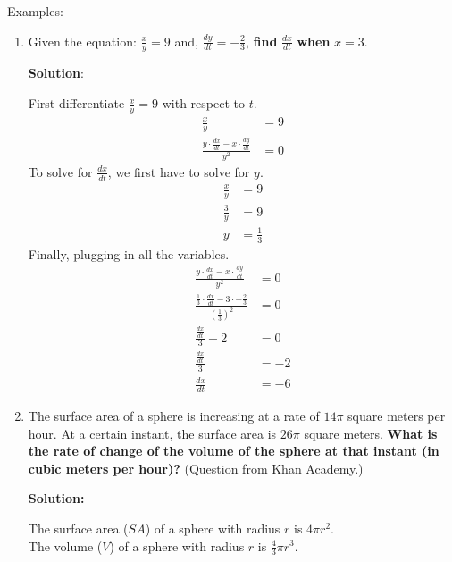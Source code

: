 \documentclass[12pt]{article}
\begin{document}
\noindent Examples:
\begin{enumerate}
	\item Given the equation: $\frac{x}{y} = 9$ and, $\frac{dy}{dt} = -\frac{2}{3}$, \textbf{find} $\frac{dx}{dt}$ \textbf{when} $x=3$.

	      \noindent \textbf{Solution}:

	      \noindent First differentiate $\frac{x}{y} = 9$ with respect to $t$.
	      \begin{align*}
		      \frac{x}{y}                                               & = 9 \\[6pt]
		      \frac{y \cdot \frac{dx}{dt} - x \cdot \frac{dy}{dt}}{y^2} & = 0
	      \end{align*}
	      To solve for $\frac{dx}{dt}$, we first have to solve for $y$.
	      \begin{align*}
		      \frac{x}{y} & = 9           \\[6pt]
		      \frac{3}{y} & = 9           \\[6pt]
		      y           & = \frac{1}{3}
	      \end{align*}
	      Finally, plugging in all the variables.
	      \begin{align*}
		      \frac{y \cdot \frac{dx}{dt} - x \cdot \frac{dy}{dt}}{y^2}                                   & = 0  \\[6pt]
		      \frac{\frac{1}{3} \cdot \frac{dx}{dt} - 3 \cdot -\frac{2}{3}}{\left( \frac{1}{3} \right)^2} & = 0  \\[6pt]
		      \frac{\frac{dx}{dt} }{3} + 2                                                                & = 0  \\[6pt]
		      \frac{\frac{dx}{dt}}{3}                                                                     & = -2 \\[6pt]
		      \frac{dx}{dt}                                                                               & = -6
	      \end{align*}
	      \smallskip

	\item The surface area of a sphere is increasing at a rate of $14 \pi$ square meters per hour. At a certain instant, the surface area is $26 \pi$ square meters. \textbf{What is the rate of change of the volume of the sphere at that instant (in cubic meters per hour)?} (Question from Khan Academy.)

	      \noindent \textbf{Solution:}

	      \noindent The surface area ($SA$) of a sphere with radius $r$ is $4 \pi r^2$.
	      \\ The volume ($V$) of a sphere with radius $r$ is $\frac{4}{3} \pi r^3$.


\end{enumerate}
\end{document}
